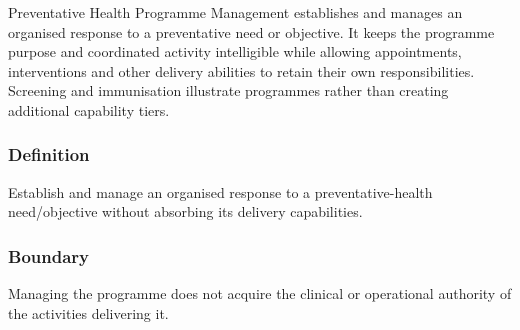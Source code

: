 Preventative Health Programme Management establishes and manages an organised response to a preventative need or objective. It keeps the programme purpose and coordinated activity intelligible while allowing appointments, interventions and other delivery abilities to retain their own responsibilities. Screening and immunisation illustrate programmes rather than creating additional capability tiers.

\subsubsection*{Definition}

Establish and manage an organised response to a preventative-health need/\allowbreak{}objective without absorbing its delivery capabilities.

\subsubsection*{Boundary}

Managing the programme does not acquire the clinical or operational authority of the activities delivering it.

